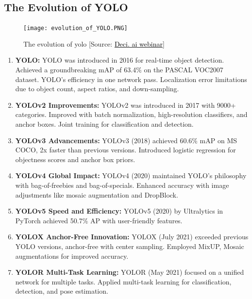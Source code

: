 \subsection{The Evolution of YOLO}
\begin{figure}[H]
    \centering
    \texttt{[image: evolution\_of\_YOLO.PNG]}
    \caption{The evolution  of yolo [Source: \href{https://deci.ai/resources/webinar-open-source-llms-vs-apis/}{\textcolor{black}{Deci. ai webinar}}]}
    \label{fig:YOLO-Evolution}
\end{figure}
\begin{enumerate}
    \item \textbf{YOLO: } YOLO was introduced in 2016 for real-time object detection.
    Achieved a groundbreaking mAP of 63.4\% on the PASCAL VOC2007 dataset.
    YOLO's efficiency in one network pass. Localization error limitations due to object count, aspect ratios, and down-sampling. \cite{redmon2016you}\\
    \item \textbf{YOLOv2 Improvements: } YOLOv2 was introduced in 2017 with 9000+ categories.
    Improved with batch normalization, high-resolution classifiers, and anchor boxes.
    Joint training for classification and detection.\cite{sang2018improved}\\
    \item \textbf{YOLOv3 Advancements: } YOLOv3 (2018) achieved 60.6\% mAP on MS COCO, 2x faster than previous versions.
    Introduced logistic regression for objectness scores and anchor box priors. \cite{redmon2018yolov3}\\
    \item \textbf{YOLOv4 Global Impact: } YOLOv4 (2020) maintained YOLO's philosophy with bag-of-freebies and bag-of-specials. Enhanced accuracy with image adjustments like mosaic augmentation and DropBlock. \cite{gai2023detection}
    \item \textbf{YOLOv5 Speed and Efficiency: } YOLOv5 (2020) by Ultralytics in PyTorch achieved 50.7\% AP with user-friendly features. \cite{wu2021real}\\
    \item \textbf{YOLOX Anchor-Free Innovation: } YOLOX (July 2021) exceeded previous YOLO versions, anchor-free with center sampling. Employed MixUP, Mosaic augmentations for improved accuracy. \cite{ge2021yolox}\\
    \item \textbf{YOLOR Multi-Task Learning: } YOLOR (May 2021) focused on a unified network for multiple tasks.
    Applied multi-task learning for classification, detection, and pose estimation.\\


\end{enumerate}
